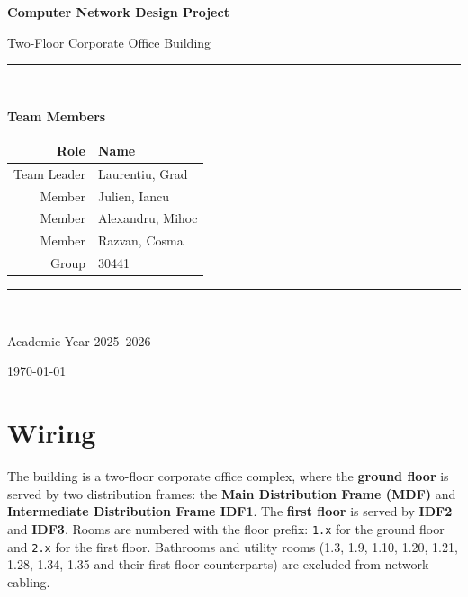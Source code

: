 \documentclass[12pt,a4paper]{report}
\newcommand{\teamleader}{Laurentiu, Grad}
\newcommand{\memberA}{Julien, Iancu}
\newcommand{\memberB}{Alexandru, Mihoc}
\newcommand{\memberC}{Razvan, Cosma}
\newcommand{\groupnumber}{30441}
\begin{document}
\begin{titlepage}
  \centering
  \vspace*{1.5cm}
  {\Huge\bfseries Computer Network Design Project\par}
  \vspace{0.6cm}
  {\large Two-Floor Corporate Office Building\par}
  \vspace{1.4cm}
  \rule{0.85\textwidth}{0.8pt}\\[0.8cm]
  {\large\textbf{Team Members}\par}
  \vspace{0.5cm}
  \begin{tabular}{r l}
    \toprule
    \textbf{Role} & \textbf{Name} \\
    \midrule
    Team Leader & \teamleader \\[4pt]
    Member      & \memberA \\[4pt]
    Member      & \memberB \\[4pt]
    Member      & \memberC \\[4pt]
    Group       & \groupnumber \\
    \bottomrule
  \end{tabular}
  \vspace{1.2cm}
  \rule{0.85\textwidth}{0.8pt}\\[1cm]
  \vfill
  {\large Academic Year 2025--2026\par}
  {\normalsize \today\par}
\end{titlepage}

\tableofcontents
\listoftables
\listoffigures

\chapter{Wiring}

The building is a two-floor corporate office complex, where the \textbf{ground floor} is served by two distribution frames:
the \textbf{Main Distribution Frame (MDF)} and
\textbf{Intermediate Distribution Frame IDF1}.
The \textbf{first floor} is served by \textbf{IDF2} and \textbf{IDF3}.
Rooms are numbered with the floor prefix: \texttt{1.x} for the ground
floor and \texttt{2.x} for the first floor.
Bathrooms and utility rooms (1.3, 1.9, 1.10, 1.20, 1.21, 1.28, 1.34, 1.35 and their first-floor counterparts) are excluded
from network cabling.
\end{document}
